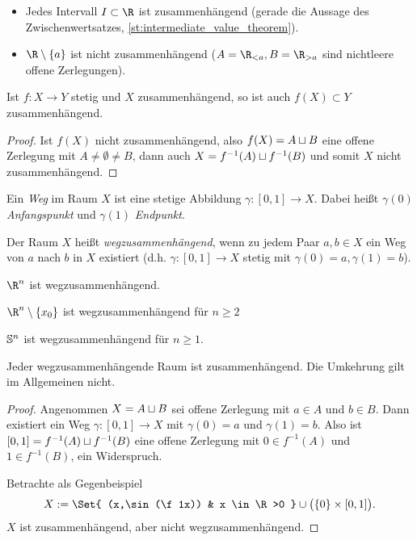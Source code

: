 \begin{ex}
	\begin{itemize}
		\item
			Jedes Intervall $I \subset \R$ ist zusammenhängend (gerade die Aussage des Zwischenwertsatzes, \ref{st:intermediate_value_theorem}).
		\item
			$\R \setminus \{a\}$ ist nicht zusammenhängend ($A = \R_{<a}, B=\R_{>a}$ sind nichtleere offene Zerlegungen).
	\end{itemize}
\end{ex}

\begin{st}
	Ist $f: X \to Y$ stetig und $X$ zusammenhängend, so ist auch $f(X) \subset Y$ zusammenhängend.
	\begin{proof}
		Ist $f(X)$ nicht zusammenhängend, also $f(X) = A \dunion B$ eine offene Zerlegung mit $A \neq \emptyset \neq B$, dann auch $X = f^{-1}(A) \dunion f^{-1}(B)$ und somit $X$ nicht zusammenhängend.
	\end{proof}
\end{st}

\begin{df}
	Ein \emph{Weg} im Raum $X$ ist eine stetige Abbildung $\gamma: [0,1] \to X$.
	Dabei heißt $\gamma(0)$ \emph{Anfangspunkt} und $\gamma(1)$ \emph{Endpunkt}.

	Der Raum $X$ heißt \emph{wegzusammenhängend}, wenn zu jedem Paar $a,b \in X$ ein Weg von $a$ nach $b$ in $X$ existiert (d.h. $\gamma:[0,1] \to X$ stetig mit $\gamma(0) = a, \gamma(1) = b$).
\end{df}

\begin{ex}
	$\R^n$ ist wegzusammenhängend.

	$\R^n \setminus \{x_0\}$ ist wegzusammenhängend für $n \ge 2$

	$\S^n$ ist wegzusammenhängend für $n \ge 1$.
\end{ex}

\begin{st}
	Jeder wegzusammenhängende Raum ist zusammenhängend.
	Die Umkehrung gilt im Allgemeinen nicht.
	\begin{proof}
		Angenommen $X = A \dunion B$ sei offene Zerlegung mit $a \in A$ und $b \in B$.
		Dann existiert ein Weg $\gamma: [0,1] \to X$ mit $\gamma(0) = a$ und $\gamma(1) = b$.
		Also ist $[0,1] = f^{-1}(A) \dunion f^{-1}(B)$ eine offene Zerlegung mit $0 \in f^{-1}(A)$ und $1 \in f^{-1}(B)$, ein Widerspruch.

		Betrachte als Gegenbeispiel
		\[
			X := \Set{ (x,\sin(\f 1x)) & x \in \R>0 } \cup \big( \{0\} \times [0,1] \big).
		\]
		$X$ ist zusammenhängend, aber nicht wegzusammenhängend.
	\end{proof}
\end{st}

